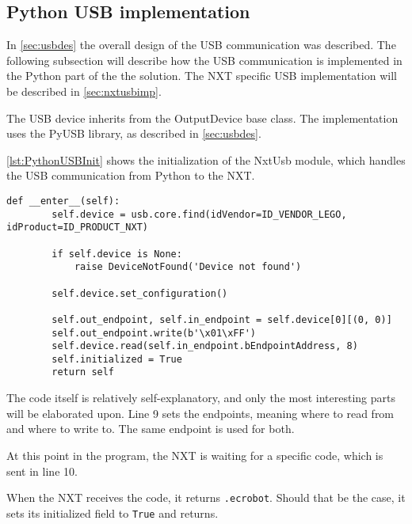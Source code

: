 \subsection{Python USB implementation}\label{sol:subsec:pythonusb}
In \autoref{sec:usbdes} the overall design of the USB communication was described.
The following subsection will describe how the USB communication is implemented in the Python part of the the solution.
The NXT specific USB implementation will be described in \autoref{sec:nxtusbimp}.

The USB device inherits from the OutputDevice base class.
The implementation uses the PyUSB library, as described in \autoref{sec:usbdes}\cite{PyUSB}.

\autoref{lst:PythonUSBInit} shows the initialization of the NxtUsb module, which handles the USB communication from Python to the NXT.
\begin{lstlisting}[label={lst:PythonUSBInit},caption={The initialization of PyUSB{.} Comments removed}]
    def __enter__(self):
        self.device = usb.core.find(idVendor=ID_VENDOR_LEGO, idProduct=ID_PRODUCT_NXT)

        if self.device is None:
            raise DeviceNotFound('Device not found')

        self.device.set_configuration()

        self.out_endpoint, self.in_endpoint = self.device[0][(0, 0)]
        self.out_endpoint.write(b'\x01\xFF') 
        self.device.read(self.in_endpoint.bEndpointAddress, 8) 
        self.initialized = True
        return self
\end{lstlisting}

The code itself is relatively self-explanatory, and only the most interesting parts will be elaborated upon.
Line 9 sets the endpoints, meaning where to read from and where to write to.
The same endpoint is used for both.

At this point in the program, the NXT is waiting for a specific code, which is sent in line 10.

When the NXT receives the code, it returns \texttt{{.}ecrobot}.
Should that be the case, it sets its initialized field to \texttt{True} and returns.




